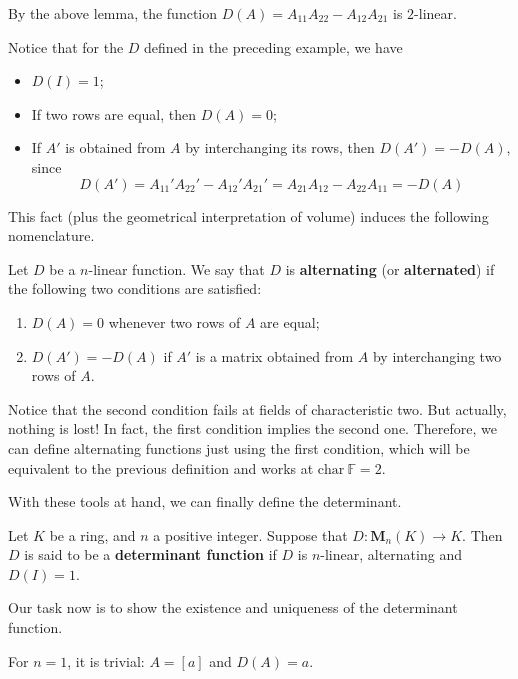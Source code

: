 \begin{example}
	By the above lemma, the function $D(A) = A_{11}A_{22} - A_{12}A_{21}$ is $2$-linear. 
\end{example}

Notice that for the $D$ defined in the preceding example, we have
\begin{itemize}
	\item $D(I) = 1$;
	\item If two rows are equal, then $D(A) = 0$; 
	\item If $A'$ is obtained from $A$ by interchanging its rows, then $D(A') = - D(A)$, since \[ D(A') = A_{11}'A_{22}' - A_{12}'A_{21}' = A_{21}A_{12} - A_{22}A_{11} = -D(A) \]
\end{itemize}

This fact (plus the geometrical interpretation of volume) induces the following nomenclature.

\begin{definition}[Alternating]
	Let $D$ be a $n$-linear function. We say that $D$ is \textbf{alternating} (or \textbf{alternated}) if the following two conditions are satisfied:
	\begin{enumerate}
		\item $D(A) = 0$ whenever two rows of $A$ are equal;
		\item $D(A') = -D(A)$ if $A'$ is a matrix obtained from $A$ by interchanging two rows of $A$.
	\end{enumerate}
\end{definition}

Notice that the second condition fails at fields of characteristic two. But actually, nothing is lost! In fact, the first condition implies the second one. Therefore, we can define alternating functions just using the first condition, which will be equivalent to the previous definition and works at $\text{char} ~\mathbb{F} = 2$.

With these tools at hand, we can finally define the determinant.

\begin{definition}[Determinant]
	Let $K$ be a ring, and $n$ a positive integer. Suppose that $D : \textbf{M}_n(K) \longrightarrow K$. Then $D$ is said to be a \textbf{determinant function} if $D$ is $n$-linear, alternating and $D(I) = 1$.
\end{definition}

Our task now is to show the existence and uniqueness of the determinant function.

For $n = 1$, it is trivial: $A = [a]$ and $D(A) = a$.

